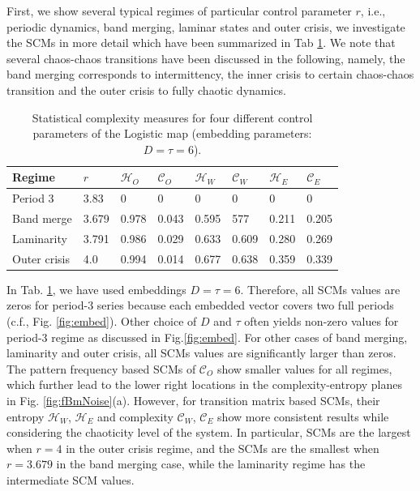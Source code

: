 \documentclass[12pt,aip,cha,reprint,nofootinbib]{revtex4-1}
\begin{document}
First, we show several typical regimes of particular control parameter $r$, i.e., periodic dynamics, band merging, laminar states and outer crisis, we investigate the SCMs in more detail which have been summarized in Tab \ref{tableLog}. We note that several chaos-chaos transitions have been discussed in the following, namely, the band merging corresponds to intermittency, the inner crisis to certain chaos-chaos transition and the outer crisis to fully chaotic dynamics. 
\begin{table}[htb]
    {\begin{tabular}{l  l  l  l  l  l  l  l}
    \hline
    Regime & $r$      & $\mathcal{H}_O$ & $\mathcal{C}_O$ & $\mathcal{H}_W$ & $\mathcal{C}_W$ & $\mathcal{H}_E$   & $\mathcal{C}_E$  \\
    \hline
    Period 3      & 3.83 & 0 & 0 & 0 & 0 & 0 & 0 \\
    \hline
    Band merge    & 3.679 & 0.978 & 0.043 & 0.595 & 577 & 0.211 & 0.205  \\
    \hline
    Laminarity    & 3.791 & 0.986 & 0.029 & 0.633 & 0.609 & 0.280 & 0.269 \\
    \hline
    Outer crisis  & 4.0 & 0.994 & 0.014 & 0.677 & 0.638 & 0.359 & 0.339 \\
    \hline
    \end{tabular}}
   \caption{Statistical complexity measures for four different control parameters of the Logistic map (embedding parameters: $D = \tau = 6$).   \label{tableLog}}    
\end{table}
In Tab. \ref{tableLog}, we have used embeddings $D = \tau = 6$. Therefore, all SCMs values are zeros for period-3 series because each embedded vector covers two full periods (c.f., Fig. \ref{fig:embed}). Other choice of $D$ and $\tau$ often yields non-zero values for period-3 regime as discussed in Fig.\ref{fig:embed}. For other cases of band merging, laminarity and outer crisis, all SCMs values are significantly larger than zeros. The pattern frequency based SCMs of $\mathcal{C}_O$ show smaller values for all regimes, which further lead to the lower right locations in the complexity-entropy planes in Fig. \ref{fig:fBmNoise}(a). However, for transition matrix based SCMs, their entropy $\mathcal{H}_W$, $\mathcal{H}_E$ and complexity $\mathcal{C}_W$, $\mathcal{C}_E$ show more consistent results while considering the chaoticity level of the system. In particular, SCMs are the largest when $r = 4$ in the outer crisis regime, and the SCMs are the smallest when $r = 3.679$ in the band merging case, while the laminarity regime has the intermediate SCM values. 
\end{document}
